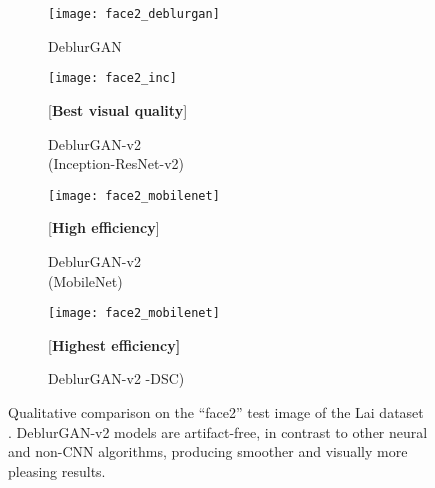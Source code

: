 \documentclass[10pt,twocolumn,letterpaper]{article}
\begin{document}
\begin{figure*}[htb]
    \bigskip
	\centering
        \begin{subfigure}[t]{0.225\textwidth}
        \texttt{[image: face2\_deblurgan]}
        \caption{DeblurGAN \cite{kupyn2018deblurgan}}
        \label{fig:lai_dg}
    \end{subfigure}
    \begin{subfigure}[t]{0.225\textwidth}
        \texttt{[image: face2\_inc]}
        \caption{DeblurGAN-v2 \\ (Inception-ResNet-v2)} \footnotesize{[\textbf{Best visual quality}]}
        \label{fig:lai_our}
    \end{subfigure}
    \begin{subfigure}[t]{0.225\textwidth}
        \texttt{[image: face2\_mobilenet]}
        \caption{DeblurGAN-v2 \\ (MobileNet)} \footnotesize{[\textbf{High efficiency}]}
        \label{fig:lai_sharp}
    \end{subfigure}
    \begin{subfigure}[t]{0.225\textwidth}
        \texttt{[image: face2\_mobilenet]}
        \caption{DeblurGAN-v2 \MobileNet-DSC)} \footnotesize{[\textbf{Highest efficiency]}}
        \label{fig:lai_sharp2}
    \end{subfigure}
    \vspace{-0.5em}
    \caption{Qualitative comparison on the ``face2'' test image of the Lai dataset \cite{lai2016comparative}. DeblurGAN-v2 models are artifact-free, in contrast to other neural and non-CNN algorithms, producing smoother and visually more pleasing results.}\label{fig:lai}
    \vspace{-1em}
\end{figure*}
\end{document}
